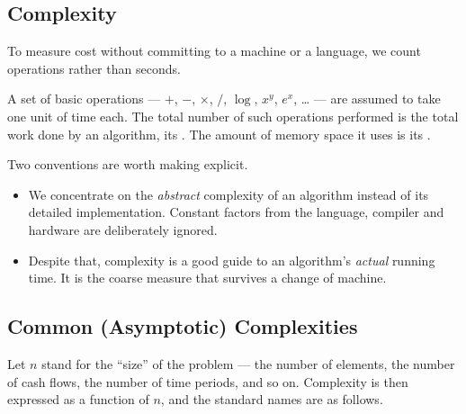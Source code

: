 \subsection{Complexity}
\label{sec:complexity-conv}


To measure cost without committing to a machine or a language, we count operations rather than seconds.

\begin{definition}
	A set of basic operations --- $+$, $-$, $\times$, $/$, $\log$, $x^{y}$, $e^{x}$, \ldots{} --- are assumed to take one unit of time each.
	The total number of such operations performed is the total work done by an algorithm, its .
	The amount of memory space it uses is its .
\end{definition}

\begin{remark}
	Two conventions are worth making explicit.
	\begin{itemize}[nosep]
		\item We concentrate on the \emph{abstract} complexity of an algorithm instead of its detailed implementation.
		      Constant factors from the language, compiler and hardware are deliberately ignored.
		\item Despite that, complexity is a good guide to an algorithm's \emph{actual} running time.
		      It is the coarse measure that survives a change of machine.
	\end{itemize}
\end{remark}

\subsection{Common (Asymptotic) Complexities}


Let $n$ stand for the ``size'' of the problem --- the number of elements, the number of cash flows, the number of time periods, and so on.
Complexity is then expressed as a function of $n$, and the standard names are as follows.

